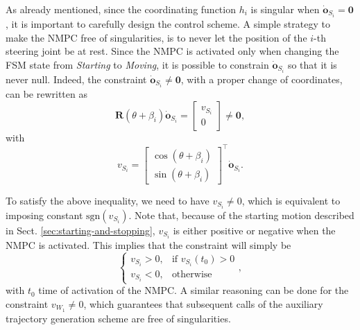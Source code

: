 As already mentioned, since the coordinating function $h_i$ is singular when
$\dot{\bm{o}}_{S_i}=\bm{0}$, it is important to carefully design the control
scheme. A simple strategy to make the NMPC free of singularities, is to never
let the position of the $i$-th steering joint be at rest. Since the NMPC is
activated only when changing the FSM state from \textit{Starting} to
\textit{Moving}, it is possible to constrain $\dot{\bm{o}}_{S_i}$ so that it
is never null. Indeed, the constraint $\dot{\bm{o}}_{S_i} \ne \bm{0}$, with a
proper change of coordinates, can be rewritten as
\begin{equation*}
    \bm{R}(\theta + \beta_i) \dot{\bm{o}}_{S_i} =
    \begin{bmatrix}
        v_{S_i} \\ 0
    \end{bmatrix} \ne \bm{0},
\end{equation*}
with
\begin{equation*}
    v_{S_i} = 
    \begin{bmatrix}
        \cos(\theta + \beta_i) \\
        \sin(\theta + \beta_i)
    \end{bmatrix}^\top \dot{\bm{o}}_{S_i}.
\end{equation*}

To satisfy the above inequality, we need to have $v_{S_i} \ne 0$, which is
equivalent to imposing constant $\mathrm{sgn}(v_{S_i})$. Note that, because of
the starting motion described in Sect. \ref{sec:starting-and-stopping},
$v_{S_i}$ is either positive or negative when the NMPC is activated.
This implies that the constraint will simply be
\begin{equation*}
\begin{cases}
    v_{S_i} > 0, & \text{if $v_{S_i}(t_0)>0$} \\
    v_{S_i} < 0, & \text{otherwise}
\end{cases},
\end{equation*}
with $t_0$ time of activation of the NMPC. A similar reasoning can be done
for the constraint $v_{W_1} \ne 0$, which guarantees that subsequent calls of
the auxiliary trajectory generation scheme are free of singularities.

